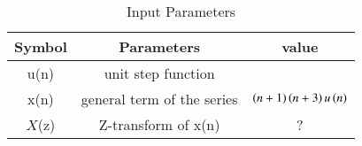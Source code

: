 \setlength{\arrayrulewidth}{0.2mm}
\setlength{\tabcolsep}{15pt}
\renewcommand{\arraystretch}{1.15}


\begin{table}[ht]
  \centering
  \begin{tabular}{|c|c|c|}
    \hline
    	Symbol & Parameters & value\\
    \hline
	  u(n) & unit step function &  \\
    \hline
	  x(n) & general term of the series & $\left(n+1\right)\left(n+3\right)u\left(n\right)$ \\
    \hline 
	 $X$(z) & Z-transform of x(n) & ? \\
    \hline
  \end{tabular}
  \vspace{0.3cm}
  \caption{Input Parameters}
  \label{tab:1.11.9.1.1}
\end{table}